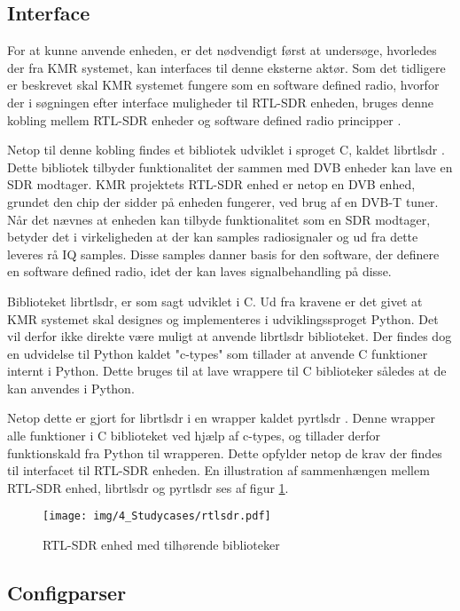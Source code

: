 \begin{appendices}
\subsection{Interface}
For at kunne anvende enheden, er det nødvendigt først at undersøge, hvorledes der fra KMR systemet, kan interfaces til denne eksterne aktør. Som det tidligere er beskrevet skal KMR systemet fungere som en software defined radio, hvorfor der i søgningen efter interface muligheder til RTL-SDR enheden, bruges denne kobling mellem RTL-SDR enheder og software defined radio principper \cite{SDR}. 

Netop til denne kobling findes et bibliotek udviklet i sproget C, kaldet librtlsdr \cite{librtlsdr}. Dette bibliotek tilbyder funktionalitet der sammen med DVB enheder kan lave en SDR modtager. KMR projektets RTL-SDR enhed er netop en DVB enhed, grundet den chip der sidder på enheden fungerer, ved brug af en DVB-T tuner. Når det nævnes at enheden kan tilbyde funktionalitet som en SDR modtager, betyder det i virkeligheden at der kan samples radiosignaler og ud fra dette leveres rå IQ samples. Disse samples danner basis for den software, der definere en software defined radio, idet der kan laves signalbehandling på disse. 

Biblioteket librtlsdr, er som sagt udviklet i C. Ud fra kravene er det givet at KMR systemet skal designes og implementeres i udviklingssproget Python. Det vil derfor ikke direkte være muligt at anvende librtlsdr biblioteket. Der findes dog en udvidelse til Python kaldet "c-types" som tillader at anvende C funktioner internt i Python. Dette bruges til at lave wrappere til C biblioteker således at de kan anvendes i Python. 

Netop dette er gjort for librtlsdr i en wrapper kaldet pyrtlsdr \cite{pyrtlsdr}. Denne wrapper alle funktioner i C biblioteket ved hjælp af c-types, og tillader derfor funktionskald fra Python til wrapperen. Dette opfylder netop de krav der findes til interfacet til RTL-SDR enheden. En illustration af sammenhængen mellem RTL-SDR enhed, librtlsdr og pyrtlsdr ses af figur \ref{fig:rtlsdr_bib}.

\begin{figure}[H]
	\centering{}
	\texttt{[image: img/4\_Studycases/rtlsdr.pdf]}
	\caption{RTL-SDR enhed med tilhørende biblioteker}
	\label{fig:rtlsdr_bib}
\end{figure} 

\pagebreak
\subsection{Configparser} \label{appendix::studycase::configparser}


\end{appendices}

